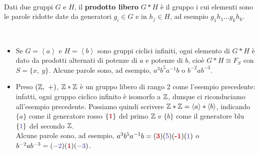 \begin{define}~{}\\
	Dati due gruppi $G$ e $H$, il \textbf{prodotto libero} $G\ast H$ è il gruppo i cui elementi sono le parole ridotte date da generatori $g_i\in G$ e in $h_j\in H$, ad esempio $g_1h_1\ldots g_k h_k$.
\end{define}
\begin{example}~{}
		\begin{itemize}
		\item Se $G=\left<a\right>$ e $H=\left<b\right>$ sono gruppi ciclici infiniti, ogni elemento di $G\ast H$ è dato da prodotti alternati di potenze di $a$ e potenze di $b$, cioè $G\ast H\cong F_S$ con $S=\{x,\ y\}$. Alcune parole sono, ad esempio, $a^3b^5a^{-1}b$ o $b^{-2}ab^{-3}$.
		\item Preso $\left(\integerset,\ +\right)$, $\mathbb{Z}\ast\mathbb{Z}$ è un gruppo libero di rango 2 come l'esempio precedente: infatti, ogni gruppo ciclico infinito è isomorfo a $\mathbb{Z}$, dunque ci riconduciamo all'esempio precedente. Possiamo quindi scrivere $\mathbb{Z}\ast\mathbb{Z}=\left<a\right>\ast\left<b\right>$, indicando $\{a\}$ come il generatore rosso $\{\textcolor{redill}{\textbf{1}}\}$ del primo $\mathbb{Z}$ e $\{b\}$ come il generatore blu $\{\textcolor{blueill}{1}\}$ del secondo $\mathbb{Z}$.\\
		Alcune parole sono, ad esempio, $a^3b^5a^{-1}b=(\textcolor{redill}{\textbf{3}})(\textcolor{blueill}{5})(\textcolor{redill}{\textbf{-1}})(\textcolor{blueill}{1})$ o $b^{-2}ab^{-3}=(\textcolor{blueill}{-2})(\textcolor{redill}{\textbf{1}})(\textcolor{blueill}{-3})$.
	\end{itemize}
\vspace{-3mm}
\end{example}

